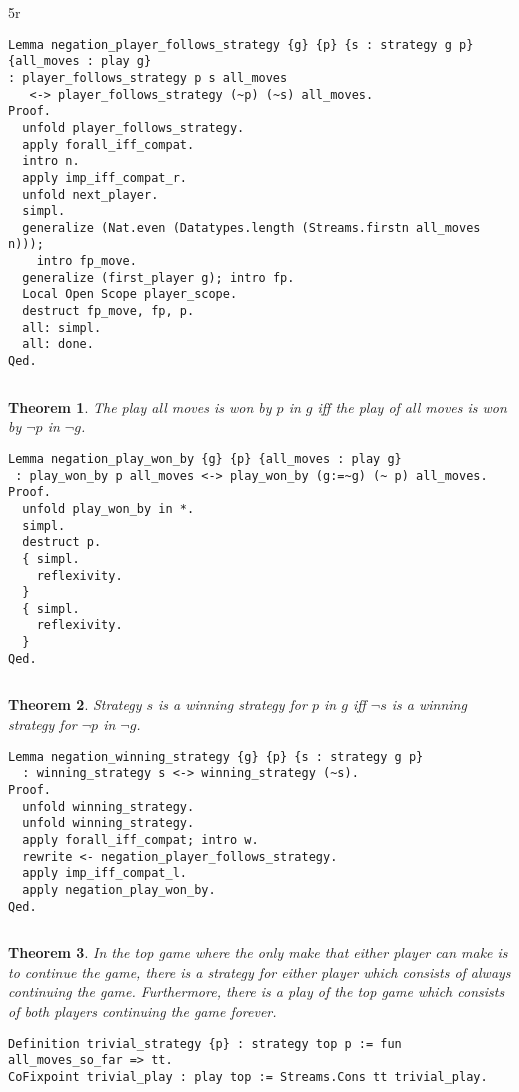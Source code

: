5r\documentclass{article}
\newtheorem{thm}{Theorem}
\theoremstyle{definition}
\begin{document}
\begin{verbatim}
Lemma negation_player_follows_strategy {g} {p} {s : strategy g p} {all_moves : play g} 
: player_follows_strategy p s all_moves
   <-> player_follows_strategy (~p) (~s) all_moves.
Proof.
  unfold player_follows_strategy.
  apply forall_iff_compat.
  intro n.
  apply imp_iff_compat_r.
  unfold next_player.
  simpl.
  generalize (Nat.even (Datatypes.length (Streams.firstn all_moves n)));
    intro fp_move.
  generalize (first_player g); intro fp.
  Local Open Scope player_scope.
  destruct fp_move, fp, p.
  all: simpl.
  all: done.
Qed.
\end{verbatim}
 $\left.\right.$
\begin{thm}
The play all moves is won by $p$ in $g$ iff the play of all moves is won by $\neg p$ in $\neg g$.
\end{thm}

\begin{verbatim}
Lemma negation_play_won_by {g} {p} {all_moves : play g}
 : play_won_by p all_moves <-> play_won_by (g:=~g) (~ p) all_moves.
Proof.
  unfold play_won_by in *.
  simpl.
  destruct p.
  { simpl.
    reflexivity.
  }
  { simpl.
    reflexivity.
  }
Qed.
\end{verbatim}

$\left.\right.$

\begin{thm}
Strategy $s$ is a winning strategy for $p$ in $g$ iff $\neg s$ is a winning strategy for $\neg p$ in $\neg g$. 
\end{thm}

\begin{verbatim}
Lemma negation_winning_strategy {g} {p} {s : strategy g p}
  : winning_strategy s <-> winning_strategy (~s).
Proof.
  unfold winning_strategy.
  unfold winning_strategy.
  apply forall_iff_compat; intro w.
  rewrite <- negation_player_follows_strategy.
  apply imp_iff_compat_l.
  apply negation_play_won_by.
Qed.
\end{verbatim}

$\left.\right.$

\begin{thm}
In the top game where the only make that either player can make is to continue the game, there is a strategy for either player which consists of always continuing the game. Furthermore, there is a play of the top game which consists of both players continuing the game forever. 
\end{thm}

\begin{verbatim}
Definition trivial_strategy {p} : strategy top p := fun all_moves_so_far => tt.
CoFixpoint trivial_play : play top := Streams.Cons tt trivial_play.
\end{verbatim}
\end{document}
